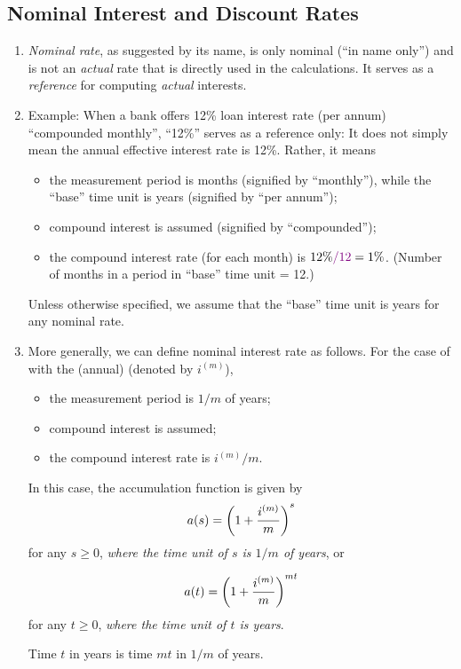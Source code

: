 \subsection{Nominal Interest and Discount Rates}
\begin{enumerate}
\item \emph{Nominal rate}, as suggested by its name, is only nominal (``in name
only'') and is not an \emph{actual} rate that is directly used in the
calculations. It serves as a \emph{reference} for computing \emph{actual}
interests.
\item Example: When a bank  offers 12\% loan interest rate
(per annum) ``compounded monthly'', ``12\%'' serves as a reference only: It
does not simply mean the annual effective interest rate is 12\%. Rather, it
means
\begin{itemize}
\item the measurement period is months (signified by ``monthly''), while the
``base'' time unit is years (signified by ``per annum'');
\item compound interest is assumed (signified by ``compounded'');
\item the compound interest rate (for each month) is
\(12\%{\color{violet}/12}=1\%\). (Number of months in a period in ``base'' time
unit = 12.)
\end{itemize}
\begin{note}
Unless otherwise specified, we assume that the ``base'' time unit is years for
any nominal rate.
\end{note}
\item More generally, we can define nominal interest rate as follows. For the
case of  with the (annual)  (denoted by \(i^{(m)}\)),
\begin{itemize}
\item the measurement period is \(1/m\) of years;
\item compound interest is assumed;
\item the compound interest rate is \(i^{(m)}/m\).
\end{itemize}
In this case, the accumulation function is given by
\[
a(s)=\qty(1+\frac{i^{(m)}}{m})^{s}
\]
for any \(s\ge 0\), \emph{where the time unit of \(s\) is \(1/m\) of years}, or

\[
a(t)=\qty(1+\frac{i^{(m)}}{m})^{mt}
\]
for any \(t\ge 0\), \emph{where the time unit of \(t\) is years}.

\begin{note}
Time \(t\) in years is time \(mt\) in \(1/m\) of years.
\begin{center}
\end{center}
\end{note}
\end{enumerate}
